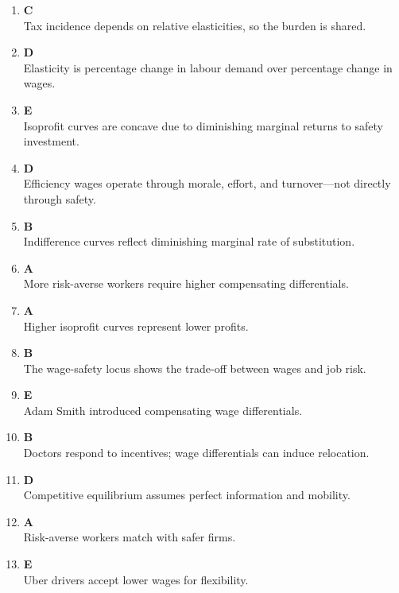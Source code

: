 \documentclass[12pt]{article}
\begin{document}
\begin{enumerate}
\item \textbf{C} \\
Tax incidence depends on relative elasticities, so the burden is shared.

\item \textbf{D} \\
Elasticity is percentage change in labour demand over percentage change in wages.

\item \textbf{E} \\
Isoprofit curves are concave due to diminishing marginal returns to safety investment.

\item \textbf{D} \\
Efficiency wages operate through morale, effort, and turnover—not directly through safety.

\item \textbf{B} \\
Indifference curves reflect diminishing marginal rate of substitution.

\item \textbf{A} \\
More risk-averse workers require higher compensating differentials.

\item \textbf{A} \\
Higher isoprofit curves represent lower profits.

\item \textbf{B} \\
The wage-safety locus shows the trade-off between wages and job risk.

\item \textbf{E} \\
Adam Smith introduced compensating wage differentials.

\item \textbf{B} \\
Doctors respond to incentives; wage differentials can induce relocation.

\item \textbf{D} \\
Competitive equilibrium assumes perfect information and mobility.

\item \textbf{A} \\
Risk-averse workers match with safer firms.

\item \textbf{E} \\
Uber drivers accept lower wages for flexibility.


\end{enumerate}
\end{document}
